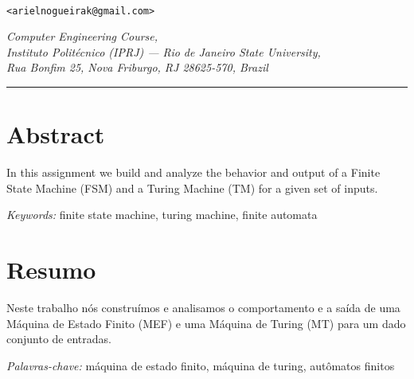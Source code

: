 \begin{center}
    \makeatletter
        {\LARGE \@title \par}

        \vspace{0.5cm}
        {
            \large \@author \\
            \small \texttt{<arielnogueirak@gmail.com>}
            \par
        }

        \vspace{0.5cm}
        \textit{
           Computer Engineering Course, \\
           Instituto Politécnico (IPRJ) --- Rio de Janeiro State University, \\
           Rua Bonfim 25, Nova Friburgo, RJ 28625-570, Brazil
        }

        \vspace{0.5cm}
        \@date
    \makeatother

    \vspace{0.5cm}
    \hrule
\end{center}

\section*{Abstract}

In this assignment we build and analyze the behavior and output of a Finite
State Machine (FSM) and a Turing Machine (TM) for a given set of inputs.

\medskip
\noindent
\textit{Keywords:} finite state machine, turing machine, finite automata

\section*{Resumo}

Neste trabalho nós construímos e analisamos o comportamento e a saída de uma
Máquina de Estado Finito (MEF) e uma Máquina de Turing (MT) para um dado
conjunto de entradas.

\medskip
\noindent
\textit{Palavras-chave:} máquina de estado finito, máquina de turing, autômatos
finitos